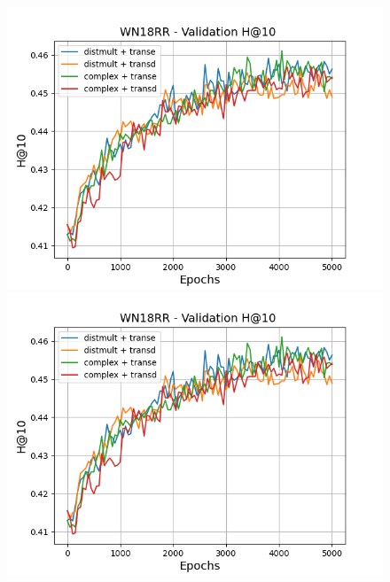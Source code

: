 \begin{figure}[H]
    \centering
    \begin{minipage}{.5\textwidth}
      \centering
      \includegraphics[width=\linewidth]{figures/results/gan_train/pretrained/random/wn18rr/gan_train_random_wn18rr_hit10s.png}
    \end{minipage}%
    \begin{minipage}{.5\textwidth}
      \centering
      \includegraphics[width=\linewidth]{figures/results/gan_train/pretrained/random/wn18rr/gan_train_random_wn18rr_hit10s.png}
    \end{minipage}
    

\end{figure}
